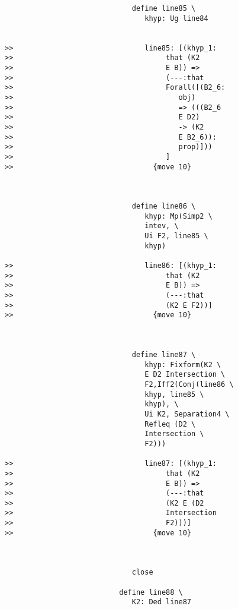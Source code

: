 \documentclass[12pt]{article}
\begin{document}
\begin{verbatim}
                              define line85 \
                                 khyp: Ug line84


>>                               line85: [(khyp_1:
>>                                    that (K2
>>                                    E B)) =>
>>                                    (---:that
>>                                    Forall([(B2_6:
>>                                       obj)
>>                                       => (((B2_6
>>                                       E D2)
>>                                       -> (K2
>>                                       E B2_6)):
>>                                       prop)]))
>>                                    ]
>>                                 {move 10}



                              define line86 \
                                 khyp: Mp(Simp2 \
                                 intev, \
                                 Ui F2, line85 \
                                 khyp)

>>                               line86: [(khyp_1:
>>                                    that (K2
>>                                    E B)) =>
>>                                    (---:that
>>                                    (K2 E F2))]
>>                                 {move 10}



                              define line87 \
                                 khyp: Fixform(K2 \
                                 E D2 Intersection \
                                 F2,Iff2(Conj(line86 \
                                 khyp, line85 \
                                 khyp), \
                                 Ui K2, Separation4 \
                                 Refleq (D2 \
                                 Intersection \
                                 F2)))

>>                               line87: [(khyp_1:
>>                                    that (K2
>>                                    E B)) =>
>>                                    (---:that
>>                                    (K2 E (D2
>>                                    Intersection
>>                                    F2)))]
>>                                 {move 10}



                              close

                           define line88 \
                              K2: Ded line87



\end{verbatim}
\end{document}
